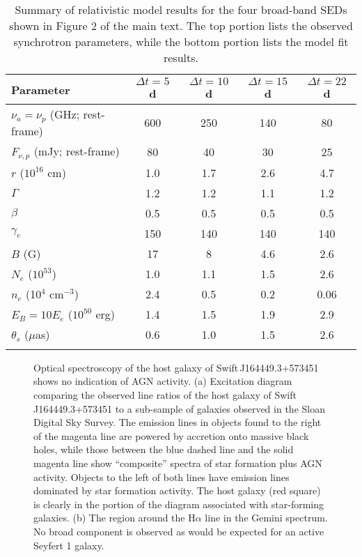 \clearpage
\begin{center}
\begin{longtable}{lcccc}
\caption{Summary of Radio SED Modeling} \\
\hline
\hline
Parameter & $\Delta t=5$ d & $\Delta t=10$ d & $\Delta t=15$ d  & $\Delta t=22$ d \\
\hline
\hline
$\nu_a=\nu_p$ (GHz; rest-frame)  & 600 & 250 & 140 & 80   \\
$F_{\nu,p}$ (mJy; rest-frame)    & 80  & 40  & 30  & 25   \\\hline 
$r$ ($10^{16}$ cm)               & 1.0 & 1.7 & 2.6 & 4.7  \\
$\Gamma$                         & 1.2 & 1.2 & 1.1 & 1.2     \\
$\beta$                          & 0.5 & 0.5 & 0.5 & 0.5      \\
$\gamma_e$                       & 150 & 140 & 140 & 140      \\
$B$ (G)                          & 17  & 8   & 4.6 & 2.6      \\
$N_e$ ($10^{53}$)                & 1.0 & 1.1 & 1.5 & 2.6      \\
$n_e$ (10$^4$ cm$^{-3}$)       & 2.4 & 0.5 & 0.2 & 0.06     \\
$E_B=10E_e$ ($10^{50}$ erg)      & 1.4 & 1.5 & 1.9 & 2.9      \\
$\theta_s$ ($\mu$as)             & 0.6 & 1.0 & 1.5 & 2.6      \\\hline 
\caption[]{Summary of relativistic model results for the four
broad-band SEDs shown in Figure 2 of the main text.  The top portion
lists the observed synchrotron parameters, while the bottom portion
lists the model fit results.}
\label{tab:model}
\end{longtable}
\end{center}


\clearpage
\begin{figure}[h!]
\centerline{}
\caption[]{\small Optical spectroscopy of the host galaxy of 
Swift\,J164449.3+573451 shows no indication of AGN activity.
(a) Excitation diagram comparing the
observed line ratios of the host galaxy of Swift\,J164449.3+573451 to
a sub-sample of galaxies observed\cite{kht+03,thk+04} in the Sloan
Digital Sky Survey.  The emission lines in objects found to the right
of the magenta line are powered by accretion onto massive black holes,
while those between the blue dashed line and the solid magenta line
show\cite{kgk+06} ``composite'' spectra of star formation plus AGN
activity.  Objects to the left of both lines have emission lines
dominated\cite{kgk+06} by star formation activity.  The host galaxy
(red square) is clearly in the portion of the diagram associated with
star-forming galaxies.  (b) The region around the H$\alpha$
line in the Gemini spectrum.  No broad component is observed as would
be expected for an active Seyfert 1 galaxy.}
\label{fig:host} 
\end{figure}


